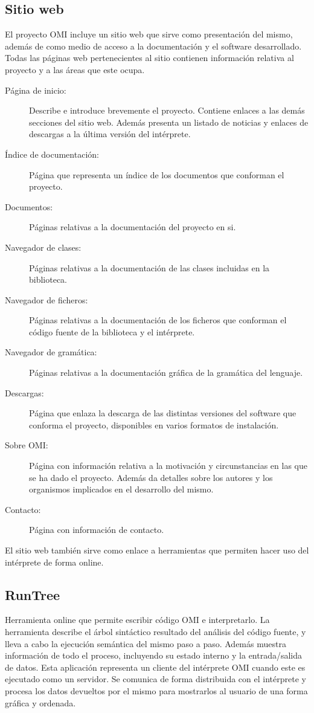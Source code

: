 \subsection{Sitio web}
El proyecto OMI incluye un sitio web que sirve como presentación del mismo, además de como medio de acceso a la documentación 
y el software desarrollado. Todas las páginas web pertenecientes al sitio contienen información relativa al proyecto y a las áreas que este
ocupa. 
\begin{description}
\item [Página de inicio:] Describe e introduce brevemente el proyecto. Contiene enlaces a las demás secciones del sitio web. Además presenta un
listado de noticias y enlaces de descargas a la última versión del intérprete.
\item [Índice de documentación:] Página que representa un índice de los documentos que conforman el proyecto.
\item [Documentos:] Páginas relativas a la documentación del proyecto en si.
\item [Navegador de clases:] Páginas relativas a la documentación de las clases incluidas en la biblioteca. 
\item [Navegador de ficheros:] Páginas relativas a la documentación de los ficheros que conforman 
el código fuente de la biblioteca y el intérprete.
\item [Navegador de gramática:] Páginas relativas a la documentación gráfica de la gramática del lenguaje.
\item [Descargas:] Página que enlaza la descarga de las distintas versiones del software que conforma el proyecto, disponibles en varios formatos de instalación.
\item [Sobre OMI:] Página con información relativa a la motivación y circunstancias en las que se ha dado el proyecto. Además da detalles sobre los autores y los
organismos implicados en el desarrollo del mismo.
\item [Contacto:] Página con información de contacto.
\end{description}

El sitio web también sirve como enlace a herramientas que permiten hacer uso del intérprete de forma online.


\subsection{RunTree} 
Herramienta online que permite escribir código OMI e interpretarlo. La herramienta describe el árbol sintáctico resultado del análisis del código fuente, y lleva a cabo la ejecución
semántica del mismo paso a paso. Además muestra información de todo el proceso, incluyendo su estado interno y la entrada/salida de datos. 
Esta aplicación representa un cliente del intérprete OMI cuando este es ejecutado como un servidor. Se comunica de forma distribuida con el intérprete y procesa los datos devueltos por el mismo
para mostrarlos al usuario de una forma gráfica y ordenada.   

